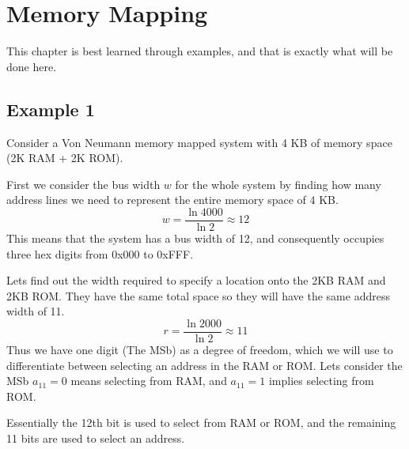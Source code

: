 \section{Memory Mapping}

This chapter is best learned through examples, and that is exactly what will be done here.

\subsection{Example 1}
Consider a Von Neumann memory mapped system with 4 KB of memory space (2K RAM + 2K ROM).

First we consider the bus width $w$ for the whole system by finding how many address lines we need to represent the entire memory space of 4 KB.
	\[ w = \frac{\ln{4000}}{\ln{2}} \approx 12	\]
This means that the system has a bus width of 12, and consequently occupies three hex digits from 0x000 to 0xFFF.

Lets find out the width required to specify a location onto the 2KB RAM and 2KB ROM. They have the same total space so they will have the same address width of 11.
	\[ r = \frac{\ln{2000}}{\ln{2}} \approx 11 \]
Thus we have one digit (The MSb) as a degree of freedom, which we will use to differentiate between selecting an address in the RAM or ROM. Lets consider the MSb $a_{11} = 0$ means selecting from RAM, and $a_{11}=1$ implies selecting from ROM.

Essentially the 12th bit is used to select from RAM or ROM, and the remaining 11 bits are used to select an address.




